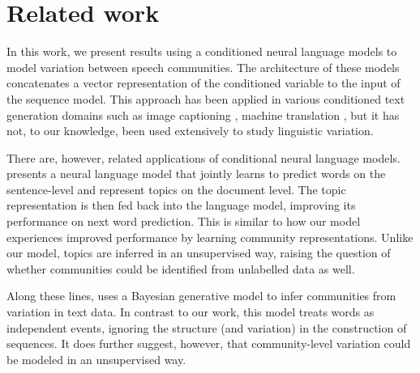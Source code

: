 \documentclass[11pt,a4paper]{article}
\begin{document}


\section{Related work}

In this work, we present results using a conditioned neural language models
to model variation between speech communities.
The architecture of these models concatenates a vector representation
of the conditioned variable to the input of the sequence model.
This approach has been applied in various conditioned text generation domains such as 
image captioning \citep{Vinyals2015}, machine translation \citep{Kalchbrenner2013},
but it has not, to our knowledge, been used extensively to study linguistic variation.

There are, however, related applications of conditional neural language models.
\citet{Lau2017a} presents a neural language model that jointly learns to predict
words on the sentence-level and represent topics on the document level.
The topic representation is then fed back into the language model, 
improving its performance on next word prediction.
This is similar to how our model experiences improved performance
by learning community representations. 
Unlike our model, topics are inferred in an unsupervised way, 
raising the question of whether communities could be identified from 
unlabelled data as well.

Along these lines, \citet{OConnor2010} uses a Bayesian generative
model to infer communities from variation in text data.  In contrast
to our work, this model treats words as independent events, ignoring
the structure (and variation) in the construction of sequences.  It
does further suggest, however, that community-level variation could be
modeled in an unsupervised way.
\end{document}
